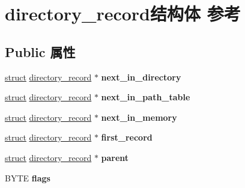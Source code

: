 \hypertarget{structdirectory__record}{}\section{directory\+\_\+record结构体 参考}
\label{structdirectory__record}
\subsection*{Public 属性}
\begin{DoxyCompactItemize}
\item 
\mbox{\label{structdirectory__record_a0e76e508975c3d5becae19fd60d204a6}} 
\hyperlink{interfacestruct}{struct} \hyperlink{structdirectory__record}{directory\+\_\+record} $\ast$ {\bfseries next\+\_\+in\+\_\+directory}
\item 
\mbox{\label{structdirectory__record_a91ac7b3ffa29faa07466dd2ee670e6f0}} 
\hyperlink{interfacestruct}{struct} \hyperlink{structdirectory__record}{directory\+\_\+record} $\ast$ {\bfseries next\+\_\+in\+\_\+path\+\_\+table}
\item 
\mbox{\label{structdirectory__record_ad576a75aff0122fc2369adb588506e6e}} 
\hyperlink{interfacestruct}{struct} \hyperlink{structdirectory__record}{directory\+\_\+record} $\ast$ {\bfseries next\+\_\+in\+\_\+memory}
\item 
\mbox{\label{structdirectory__record_a5034e690d518c146f4d37c4f6e78a6e0}} 
\hyperlink{interfacestruct}{struct} \hyperlink{structdirectory__record}{directory\+\_\+record} $\ast$ {\bfseries first\+\_\+record}
\item 
\mbox{\label{structdirectory__record_a48ec1679c3ea77e9bfff9a6ac1e870b3}} 
\hyperlink{interfacestruct}{struct} \hyperlink{structdirectory__record}{directory\+\_\+record} $\ast$ {\bfseries parent}
\item 
\mbox{\label{structdirectory__record_aa96c5b0827a6c4325672dfebc1446c3a}} 
B\+Y\+TE {\bfseries flags}
\item 
\mbox{\label{structdirectory__record_a936a8d3935720fb61f42e215c66c235d}} 

\end{DoxyCompactItemize}

